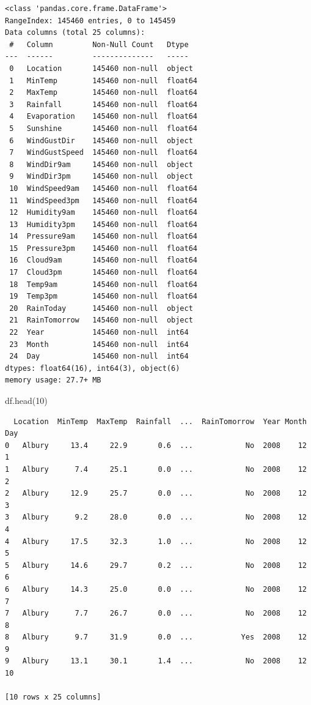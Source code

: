 \documentclass[
  letterpaper,
  DIV=11,
  numbers=noendperiod]{scrartcl}
\newenvironment{Shaded}{\begin{snugshade}}{\end{snugshade}}
\newcommand{\DecValTok}[1]{\textcolor[rgb]{0.68,0.00,0.00}{#1}}
\newcommand{\NormalTok}[1]{\textcolor[rgb]{0.00,0.23,0.31}{#1}}
\begin{document}
\begin{verbatim}
<class 'pandas.core.frame.DataFrame'>
RangeIndex: 145460 entries, 0 to 145459
Data columns (total 25 columns):
 #   Column         Non-Null Count   Dtype  
---  ------         --------------   -----  
 0   Location       145460 non-null  object 
 1   MinTemp        145460 non-null  float64
 2   MaxTemp        145460 non-null  float64
 3   Rainfall       145460 non-null  float64
 4   Evaporation    145460 non-null  float64
 5   Sunshine       145460 non-null  float64
 6   WindGustDir    145460 non-null  object 
 7   WindGustSpeed  145460 non-null  float64
 8   WindDir9am     145460 non-null  object 
 9   WindDir3pm     145460 non-null  object 
 10  WindSpeed9am   145460 non-null  float64
 11  WindSpeed3pm   145460 non-null  float64
 12  Humidity9am    145460 non-null  float64
 13  Humidity3pm    145460 non-null  float64
 14  Pressure9am    145460 non-null  float64
 15  Pressure3pm    145460 non-null  float64
 16  Cloud9am       145460 non-null  float64
 17  Cloud3pm       145460 non-null  float64
 18  Temp9am        145460 non-null  float64
 19  Temp3pm        145460 non-null  float64
 20  RainToday      145460 non-null  object 
 21  RainTomorrow   145460 non-null  object 
 22  Year           145460 non-null  int64  
 23  Month          145460 non-null  int64  
 24  Day            145460 non-null  int64  
dtypes: float64(16), int64(3), object(6)
memory usage: 27.7+ MB
\end{verbatim}

\begin{Shaded}
\begin{Highlighting}[]
\NormalTok{df.head(}\DecValTok{10}\NormalTok{)}
\end{Highlighting}
\end{Shaded}

\begin{verbatim}
  Location  MinTemp  MaxTemp  Rainfall  ...  RainTomorrow  Year Month  Day
0   Albury     13.4     22.9       0.6  ...            No  2008    12    1
1   Albury      7.4     25.1       0.0  ...            No  2008    12    2
2   Albury     12.9     25.7       0.0  ...            No  2008    12    3
3   Albury      9.2     28.0       0.0  ...            No  2008    12    4
4   Albury     17.5     32.3       1.0  ...            No  2008    12    5
5   Albury     14.6     29.7       0.2  ...            No  2008    12    6
6   Albury     14.3     25.0       0.0  ...            No  2008    12    7
7   Albury      7.7     26.7       0.0  ...            No  2008    12    8
8   Albury      9.7     31.9       0.0  ...           Yes  2008    12    9
9   Albury     13.1     30.1       1.4  ...            No  2008    12   10

[10 rows x 25 columns]
\end{verbatim}
\end{document}
